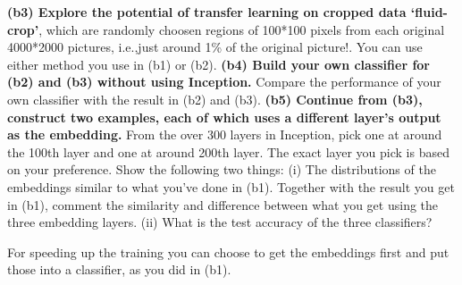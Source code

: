 \documentclass[12pt]{amsart}
\begin{document}
\begin{enumerate}
\begin{enumerate}
\vskip 0.7cm
\textbf{(b3) Explore the potential of transfer learning on cropped data `fluid-crop'}, which are randomly choosen regions of 100*100 pixels from each original 4000*2000 pictures, i.e.,just around 1\% of the original picture!. You can use either method you use in (b1) or (b2).
\vskip 0.7cm
\textbf{(b4) Build your own classifier for (b2) and (b3) without using Inception.} Compare the performance of your own classifier with the result in (b2) and (b3).
\vskip 0.7cm
\textbf{(b5) Continue from (b3), construct two examples, each of which uses a different layer's output as the embedding.} From the over 300 layers in Inception, pick one at around the 100th layer and one at around 200th layer. The exact layer you pick is based on your preference. Show the following two things: (i) The distributions of the embeddings similar to what you've done in (b1). Together with the result you get in (b1), comment the similarity and difference between what you get using the three embedding layers.
(ii) What is the test accuracy of the three classifiers? 

For speeding up the training you can choose to get the embeddings first and put those into a classifier, as you did in (b1). 
\end{enumerate}

\end{enumerate}
\end{document}
